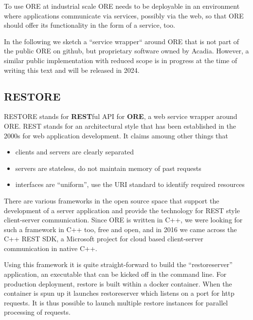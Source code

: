 \documentclass[12pt, a4paper]{report}
\begin{document}
To use ORE at industrial scale ORE needs to be deployable in an environment where applications
communicate via services, possibly via the web, so that ORE should offer its functionality in the form of
a service, too.

In the following we sketch a ``service wrapper`` around ORE that is not part of the
public ORE on github, but proprietary software owned by Acadia. However, a similar public
implementation with reduced scope is in progress at the time of writing this text and will be
released in 2024.

\subsection*{RESTORE}

RESTORE stands for {\bf REST}ful API for {\bf ORE}, a web service wrapper around ORE.
REST stands for an architectural style that has been established in the 2000s for web application
development. It claims amoung other things that
\begin{itemize}
\item clients and servers are clearly separated
\item servers are stateless, do not maintain memory of past requests
\item interfaces are ``uniform'', use the URI standard to identify required resources
\end{itemize}
There are various frameworks in the open source space that support the development of a server application
and provide the technology for REST style client-server communication. Since ORE is written in C++, we were
looking for such a framework in C++ too, free and open, and in 2016 we came across the C++ REST SDK,
a Microsoft project for cloud based client-server communication in native C++. 

Using this framework it is quite straight-forward to build the ``restoreserver'' application, an executable
that can be kicked off in the command line. For production deployment, restore is built within a
{\rm docker container}. When the container is spun up it launches restoreserver which listens on a
port for http requests. It is thus possible to launch multiple restore instances for parallel processing
of requests.
\end{document}
